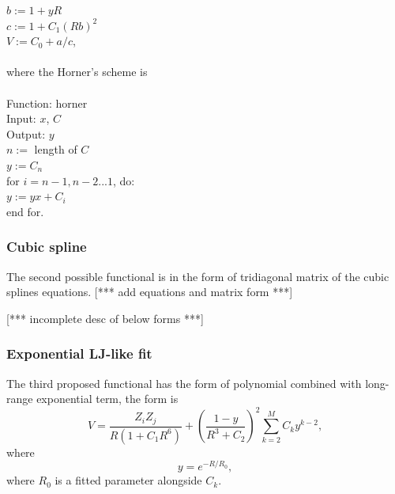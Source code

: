 \documentclass[12pt]{article}
\def\att{                    %
        \marginpar[ \hspace*{\fill} \raisebox{-0.2em}{\rule{2mm}{1.2em}} ]
        {\raisebox{-0.2em}{\rule{2mm}{1.2em}} }
        }
\def\at#1{[*** \att #1 ***]}  %
\def\spc{\hspace*{0.5cm}} 			%
\begin{document}
$b := 1 + yR$\\
$c := 1 + C_1(Rb)^2$\\
$V := C_0 + a/c$, \\
\\
where the Horner's scheme is
\\
\\
Function: horner \\
Input: $x$, $C$ \\
Output: $y$ \\
$n := $ length of $C$ \\
$y := C_n$ \\
for $i=n-1, n-2 ... 1$, do: \\
\spc $y := yx + C_i$ \\
end for.

\iffalse

\subsubsection{Cubic spline}
The second possible functional is in the form of tridiagonal matrix of the cubic splines equations.
\at{add equations and matrix form}

\at{incomplete desc of below forms}


\subsubsection{Exponential LJ-like fit}
The third proposed functional has the form of polynomial combined with long-range exponential term, the form is
\begin{equation}
    V = \frac{Z_iZ_j}{R(1+C_1R^6)} + \left(\frac{1-y}{R^3+C_2}\right)^2\sum^M_{k=2}C_ky^{k-2},
\end{equation}
where
\begin{equation}
    y = e^{-R/R_0},
\end{equation}
where $R_0$ is a fitted parameter alongside $C_k$.
\end{document}
